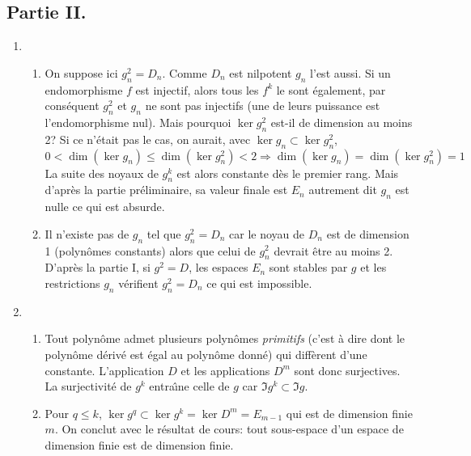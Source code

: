 \subsection*{Partie II.}
\begin{enumerate}
  \item
\begin{enumerate}
\item On suppose ici $g_n^2 = D_n$. Comme $D_n$ est nilpotent $g_n$ l'est aussi. Si un endomorphisme $f$ est injectif, alors tous les $f^k$ le sont également,  par cons{\'e}quent $g_n^2$ et $g_n$ ne sont pas injectifs (une de leurs puissance est l'endomorphisme nul). Mais pourquoi $\ker g_n^2$ est-il de dimension au moins 2?\newline
Si ce n'était pas le cas, on aurait, avec $\ker g_n \subset \ker g_n^2$, 
\begin{displaymath}
  0 < \dim (\ker g_n) \leq \dim (\ker g_n^2) < 2 \Rightarrow \dim (\ker g_n) = \dim (\ker g_n^2) = 1 
\end{displaymath}
La suite des noyaux de $g_n^k$ est alors constante d{\`e}s le premier rang. Mais d'apr{\`e}s la partie pr{\'e}liminaire, sa valeur finale est $E_n$ autrement dit $g_n$ est nulle ce qui est absurde.
 \item Il n'existe pas de $g_n$ tel que $g_n^2 = D_n$ car le noyau de $D_n$ est de dimension 1 (polynômes constants) alors que celui de $g_n^2$ devrait {\^e}tre au moins 2.\newline
D'après la partie I, si $g^2 = D$, les espaces $E_n$ sont stables par $g$ et les restrictions $g_n$ vérifient $g_n^2 = D_n$ ce qui est impossible. 
     \end{enumerate}

  \item \begin{enumerate}
\item Tout polyn{\^o}me admet plusieurs polyn{\^o}mes \emph{primitifs} (c'est à dire dont le polynôme dérivé est égal au polynôme donné) qui diff{\`e}rent d'une constante. L'application $D$ et les applications $D^m$ sont donc surjectives.\newline 
La surjectivit{\'e} de $g^k$ entra{\^\i}ne celle de $g$ car $\Im g^k \subset \Im g$.

\item Pour $q\leq k$, $\ker g^q \subset \ker g^k=\ker D^m=E_{m-1}$ qui est de dimension finie $m$. On conclut avec le résultat de cours: tout sous-espace d'un espace de dimension finie est de dimension finie.


\end{enumerate}
\end{enumerate}
